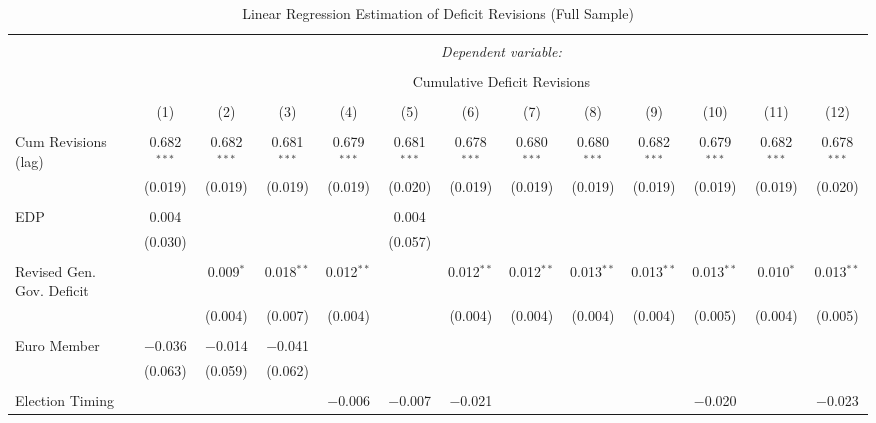 
\begin{table}[!htbp] \centering 
  \caption{Linear Regression Estimation of Deficit Revisions (Full Sample)} 
  \label{deficit_results} 
\tiny 
\begin{tabular}{@{\extracolsep{5pt}}lcccccccccccc} 
\\[-1.8ex]\hline 
\hline \\[-1.8ex] 
 & \multicolumn{12}{c}{\textit{Dependent variable:}} \\ 
\cline{2-13} 
\\[-1.8ex] & \multicolumn{12}{c}{Cumulative Deficit Revisions} \\ 
\\[-1.8ex] & (1) & (2) & (3) & (4) & (5) & (6) & (7) & (8) & (9) & (10) & (11) & (12)\\ 
\hline \\[-1.8ex] 
 Cum Revisions (lag) & 0.682$^{***}$ & 0.682$^{***}$ & 0.681$^{***}$ & 0.679$^{***}$ & 0.681$^{***}$ & 0.678$^{***}$ & 0.680$^{***}$ & 0.680$^{***}$ & 0.682$^{***}$ & 0.679$^{***}$ & 0.682$^{***}$ & 0.678$^{***}$ \\ 
  & (0.019) & (0.019) & (0.019) & (0.019) & (0.020) & (0.019) & (0.019) & (0.019) & (0.019) & (0.019) & (0.019) & (0.020) \\ 
  & & & & & & & & & & & & \\ 
 EDP & 0.004 &  &  &  & 0.004 &  &  &  &  &  &  &  \\ 
  & (0.030) &  &  &  & (0.057) &  &  &  &  &  &  &  \\ 
  & & & & & & & & & & & & \\ 
 Revised Gen. Gov. Deficit &  & 0.009$^{*}$ & 0.018$^{**}$ & 0.012$^{**}$ &  & 0.012$^{**}$ & 0.012$^{**}$ & 0.013$^{**}$ & 0.013$^{**}$ & 0.013$^{**}$ & 0.010$^{*}$ & 0.013$^{**}$ \\ 
  &  & (0.004) & (0.007) & (0.004) &  & (0.004) & (0.004) & (0.004) & (0.004) & (0.005) & (0.004) & (0.005) \\ 
  & & & & & & & & & & & & \\ 
 Euro Member & $-$0.036 & $-$0.014 & $-$0.041 &  &  &  &  &  &  &  &  &  \\ 
  & (0.063) & (0.059) & (0.062) &  &  &  &  &  &  &  &  &  \\ 
  & & & & & & & & & & & & \\ 
 Election Timing &  &  &  & $-$0.006 & $-$0.007 & $-$0.021 &  &  &  & $-$0.020 &  & $-$0.023 \\ 

\end{tabular}
\end{table}
